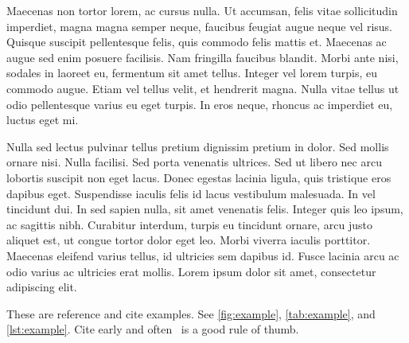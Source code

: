 Maecenas non tortor lorem, ac cursus nulla. Ut accumsan, felis vitae sollicitudin imperdiet, magna magna semper neque, faucibus feugiat augue neque vel risus. Quisque suscipit pellentesque felis, quis commodo felis mattis et. Maecenas ac augue sed enim posuere facilisis. Nam fringilla faucibus blandit. Morbi ante nisi, sodales in laoreet eu, fermentum sit amet tellus. Integer vel lorem turpis, eu commodo augue. Etiam vel tellus velit, et hendrerit magna. Nulla vitae tellus ut odio pellentesque varius eu eget turpis. In eros neque, rhoncus ac imperdiet eu, luctus eget mi.

Nulla sed lectus pulvinar tellus pretium dignissim pretium in dolor. Sed mollis ornare nisi. Nulla facilisi. Sed porta venenatis ultrices. Sed ut libero nec arcu lobortis suscipit non eget lacus. Donec egestas lacinia ligula, quis tristique eros dapibus eget. Suspendisse iaculis felis id lacus vestibulum malesuada. In vel tincidunt dui. In sed sapien nulla, sit amet venenatis felis. Integer quis leo ipsum, ac sagittis nibh. Curabitur interdum, turpis eu tincidunt ornare, arcu justo aliquet est, ut congue tortor dolor eget leo. Morbi viverra iaculis porttitor. Maecenas eleifend varius tellus, id ultricies sem dapibus id. Fusce lacinia arcu ac odio varius ac ultricies erat mollis. Lorem ipsum dolor sit amet, consectetur adipiscing elit.

These are reference and cite examples. See \cref{fig:example}, \cref{tab:example}, and \cref{lst:example}. Cite early and often~\cite{exampleentry} is a good rule of thumb.
